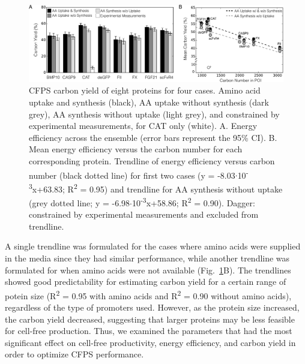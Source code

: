 \documentclass[journal=asbcd6,manuscript=article]{achemso}
\begin{document}
\begin{figure}[t!]
\centering
\includegraphics[width=1.00\textwidth]{./Figures/Yield.pdf}
\caption{CFPS carbon yield of eight proteins for four cases. Amino acid uptake and synthesis (black), AA uptake without synthesis (dark grey), AA synthesis without uptake (light grey), and constrained by experimental measurements, for CAT only (white). A. Energy efficiency across the ensemble (error bars represent the 95\% CI). B. Mean energy efficiency versus the carbon number for each corresponding protein. Trendline of energy efficiency versus carbon number (black dotted line) for first two cases (y = -8.03$\cdot$10\textsuperscript{-3}x+63.83; R\textsuperscript{2} = 0.95) and trendline for AA synthesis without uptake (grey dotted line; y = -6.98$\cdot$10\textsuperscript{-3}x+58.86; R\textsuperscript{2} = 0.90). Dagger: constrained by experimental measurements and excluded from trendline.}
\label{fig:Yield}
\end{figure}
A single trendline was formulated for the cases where amino acids were supplied in the media since they had similar performance, while another trendline was formulated for when amino acids were not available (Fig.~\ref{fig:Yield}B).
The trendlines showed good predictability for estimating carbon yield for a certain range of potein size (R\textsuperscript{2} = 0.95 with amino acids and R\textsuperscript{2} = 0.90 without amino acids), regardless of the type of promoters used.
However, as the protein size increased, the carbon yield decreased, suggesting that larger proteins may be less feasible for cell-free production.
Thus, we examined the parameters that had the most significant effect on cell-free productivity, energy efficiency, and carbon yield in order to optimize CFPS performance.
\end{document}
